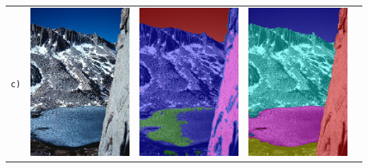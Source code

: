 \begin{table}[h!]
\begin{tabularx}{\textwidth}{>{\centering}m{}
			>{\centering}m{}
			>{\centering}m{}
			>{\centering}m{}
			>{\centering\arraybackslash}m{}}
		\texttt{c)} &
		\includegraphics[width=0.4\linewidth]{images/bsd/167083.jpg} &
		\includegraphics[width=0.4\linewidth]{images/gen/bsd_results/167083.jpg_seg.png} &
		\includegraphics[width=0.4\linewidth]{images/gen/bsd_results/167083.jpg_gt_5.png} \\
		

\end{tabularx}
\end{table}
